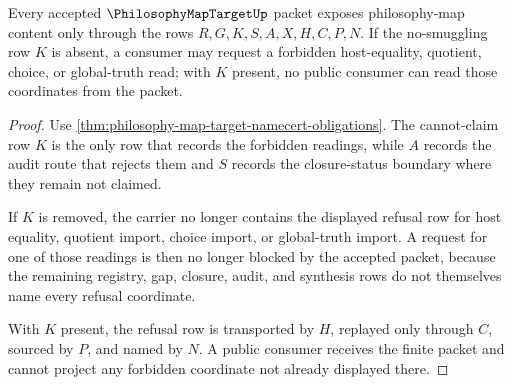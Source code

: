 \begin{theorem}
\label{thm:philosophy-map-target-nosmuggling-boundary}
Every accepted $\PhilosophyMapTargetUp$ packet exposes philosophy-map content only through the rows $R,G,K,S,A,X,H,C,P,N$. If the no-smuggling row $K$ is absent, a consumer may request a forbidden host-equality, quotient, choice, or global-truth read; with $K$ present, no public consumer can read those coordinates from the packet.
\end{theorem}
\begin{proof}
Use \autoref{thm:philosophy-map-target-namecert-obligations}. The cannot-claim row $K$ is the only row that records the forbidden readings, while $A$ records the audit route that rejects them and $S$ records the closure-status boundary where they remain not claimed.

If $K$ is removed, the carrier no longer contains the displayed refusal row for host equality, quotient import, choice import, or global-truth import. A request for one of those readings is then no longer blocked by the accepted packet, because the remaining registry, gap, closure, audit, and synthesis rows do not themselves name every refusal coordinate.

With $K$ present, the refusal row is transported by $H$, replayed only through $C$, sourced by $P$, and named by $N$. A public consumer receives the finite packet and cannot project any forbidden coordinate not already displayed there.
\end{proof}

